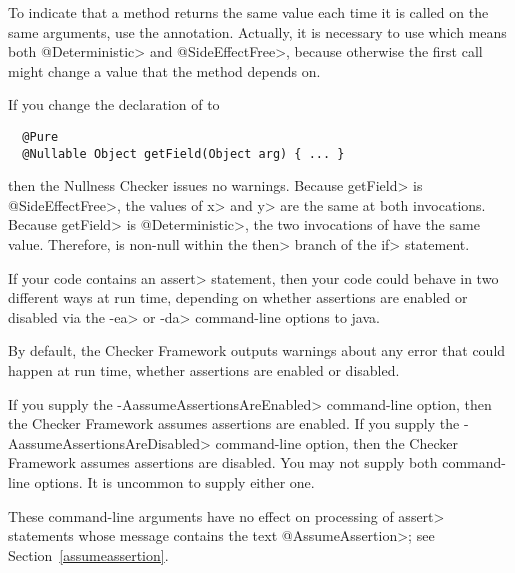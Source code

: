 To indicate that a method returns the same value each time it is called on
the same arguments, use the  annotation.
Actually, it is necessary to use  which
means both \<@Deterministic> and \<@SideEffectFree>, because otherwise the
first call might change a value that the method depends on.

If you change the declaration of  to

\begin{Verbatim}
  @Pure
  @Nullable Object getField(Object arg) { ... }
\end{Verbatim}

\noindent
then the Nullness Checker issues no warnings.
Because \<getField> is \<@SideEffectFree>, the values of \<x> and \<y> are the
same at both invocations.
Because \<getField> is \<@Deterministic>, the two invocations of
 have the same value.
Therefore,  is non-null within the \<then> branch
of the \<if> statement.




If your code contains an \<assert> statement, then your code could behave
in two different ways at run time, depending on whether assertions are
enabled or disabled
via the \<-ea> or \<-da> command-line options to java.

By default, the Checker Framework outputs warnings about any error that
could happen at run time, whether assertions are enabled or disabled.

If you supply the \<-AassumeAssertionsAreEnabled> command-line option, then
the Checker Framework assumes assertions are enabled.  If you supply the
\<-AassumeAssertionsAreDisabled> command-line option, then the Checker
Framework assumes assertions are disabled.  You may not supply both
command-line options.  It is uncommon to supply either one.

These command-line arguments have no effect on processing of \<assert>
statements whose message contains the text \<@AssumeAssertion>; see
Section~\ref{assumeassertion}.



